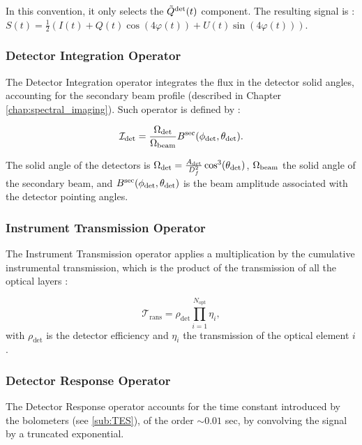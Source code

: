 \documentclass[../../thesis.tex]{subfiles}
\begin{document}
In this convention, it only selects the $\tilde{Q}^{\rm det}(t)$ component. The resulting signal is : $S(t) = \frac{1}{2} \left(I(t) + Q(t)\cos(4\varphi(t)) + U(t)\sin(4\varphi(t))\right)$.

\subsubsection{Detector Integration Operator}

The Detector Integration operator integrates the flux in the detector solid angles, accounting for the secondary beam profile (described in Chapter \ref{chap:spectral_imaging}). Such operator is defined by : 

\begin{equation}
    {\cal I}_{\rm det}= \frac{\Omega_{\rm det}}{\Omega_{\rm beam}} B^{\rm sec}(\phi_{\rm det}, \theta_{\rm det}).
\end{equation}

The solid angle of the detectors is $\Omega_{\rm det}=\frac{A_{\rm det}}{D_f^2}\cos^3(\theta_{\rm det})$, $\Omega_{\rm beam}$ the solid angle of the secondary beam, and $B^{\rm sec}(\phi_{\rm det}, \theta_{\rm det})$ is the beam amplitude associated with the detector pointing angles.   

\subsubsection{Instrument Transmission Operator}

The Instrument Transmission operator applies a multiplication by the cumulative instrumental transmission, which is the product of the transmission of all the optical layers :

\begin{equation}
    \mathcal{T}_{\text{rans}} = \rho_{\text{det}} \prod_{i=1}^{N_{\text{opt}}} \eta_i,
\end{equation}
with $\rho_{\text{det}}$ is the detector efficiency and $\eta_i$ the transmission of the optical element $i$.

\subsubsection{Detector Response Operator}

The Detector Response operator accounts for the time constant introduced by the bolometers (see \ref{sub:TES}), of the order $\sim 0.01$ sec, by convolving the signal by a truncated exponential.
\end{document}
